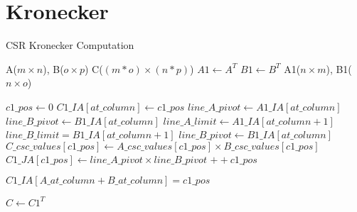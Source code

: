 \documentclass{article}
\begin{document}
\section{Kronecker}
\begin{algorithm}
\caption{CSR Kronecker Computation}\label{kron}
\begin{algorithmic}[1]

\Require A($m\times n$), B($o\times p$)
\Ensure C($(m * o) \times (n * p)$)
\Statex
\State $A1 \gets A^{T}$
\State $B1 \gets B^{T}$
\Statex
\Require A1($n\times m$), B1($n\times o$)
\Statex

\State $c1\_pos \gets 0$
    \State $C1\_IA[at\_column] \gets c1\_pos$
    \State $line\_A\_pivot \gets A1\_IA[at\_column]$
    \State $line\_B\_pivot \gets B1\_IA[at\_column]$
    \State $line\_A\_limit \gets A1\_IA[at\_column+1]$
    \State $line\_B\_limit = B1\_IA[at\_column+1]$
    \Statex
{}
    \Statex
		\State $line\_B\_pivot \gets B1\_IA[at\_column]$
			\State $C\_csc\_values[c1\_pos]  \gets A\_csc\_values[c1\_pos] \times B\_csc\_values[c1\_pos]$
			\State $C1\_JA[c1\_pos] \gets line\_A\_pivot \times line\_B\_pivot$
			\State $++c1\_pos$
		\EndFor
	\EndFor
\EndFor

\EndFor
\Statex
\State $C1\_IA[A\_at\_column+B\_at\_column]=c1\_pos$

\Statex
\State $C \gets C1^{T}$

\end{algorithmic}
\end{algorithm}
\end{document}
